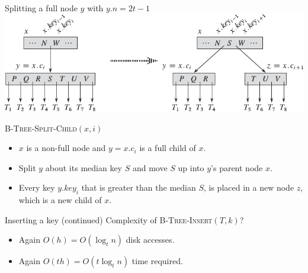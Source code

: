 \documentclass[11pt,t]{beamer}
\begin{document}
	\begin{frame}{Splitting a full node \(y\) with \(y.n = 2t-1\)}
		\centering
		\includegraphics[width=.7\textwidth]{images/splitting}
		\vspace{0.3cm}

		\raggedright
		\onslide<+->\textsc{B-Tree-Split-Child}\((x,i)\)
		\begin{itemize}
			\item \(x\) is a non-full node and \(y=x.c_i\) is a full child of \(x\).
			\item Split \(y\) about its median key \(S\) and move \(S\) up into \(y\)'s parent node \(x\).
			\item Every key \(y.key_i\) that is greater than the median \(S\), is placed in a new node \(z\), which is a new child of \(x\).
		\end{itemize}
	\end{frame}

	\begin{frame}{Inserting a key (continued)}
		Complexity of \textsc{B-Tree-Insert}\((T,k)\)?
		\pause
		\begin{itemize}[<+->]
			\item Again \(O(h) = O(\log_t n)\) disk accesses.
			\item Again \(O(th)=O(t \log_t n)\) time required.
		\end{itemize}
	\end{frame}
\end{document}
